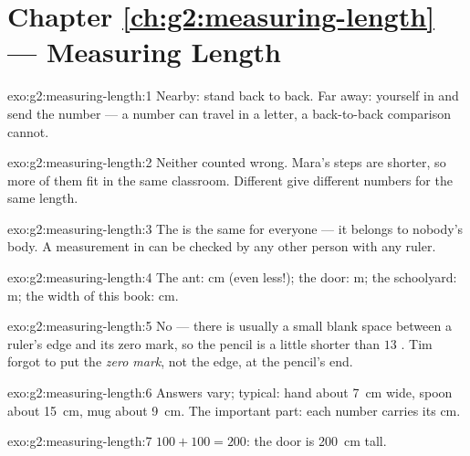\section*{Chapter \ref{ch:g2:measuring-length} --- Measuring Length}

\begin{solution}{exo:g2:measuring-length:1}
Nearby: stand back to back. Far away:  yourself in
 and send the number --- a number can travel in a letter,
a back-to-back comparison cannot.
\end{solution}

\begin{solution}{exo:g2:measuring-length:2}
Neither counted wrong. Mara's steps are shorter, so more of them fit
in the same classroom. Different  give different numbers for the
same length.
\end{solution}

\begin{solution}{exo:g2:measuring-length:3}
The  is the same for everyone --- it belongs to nobody's
body. A measurement in  can be checked by any other
person with any ruler.
\end{solution}

\begin{solution}{exo:g2:measuring-length:4}
The ant: \unit{cm} (even less!); the door: \unit{m}; the schoolyard:
\unit{m}; the width of this book: \unit{cm}.
\end{solution}

\begin{solution}{exo:g2:measuring-length:5}
No --- there is usually a small blank space between a ruler's edge
and its zero mark, so the pencil is a little shorter than $13$
. Tim forgot to put the \emph{zero mark}, not the edge, at
the pencil's end.
\end{solution}

\begin{solution}{exo:g2:measuring-length:6}
Answers vary; typical: hand about \qty{7}{cm} wide, spoon about
\qty{15}{cm}, mug about \qty{9}{cm}. The important part: each number
carries its \unit{cm}.
\end{solution}

\begin{solution}{exo:g2:measuring-length:7}
$100 + 100 = 200$: the door is \qty{200}{cm} tall.
\end{solution}

